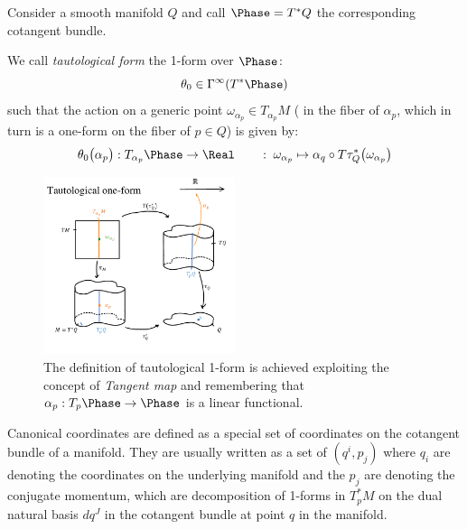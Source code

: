 \documentclass[Main]{subfiles}
\begin{document}
					Consider a smooth manifold $Q$ and call $\Phase=T^*Q$ the corresponding cotangent bundle.
					\begin{definition}
						We call \emph{tautological form} the 1-form over $\Phase$:
						\begin{displaymath}
							\theta_0 \in \Gamma^\infty (T^*\Phase)
						\end{displaymath}
					such that the action on a generic point $ \omega_{\alpha_p} \in T_{\alpha_p}M$ ( in the fiber of $\alpha_p$, which in turn is a one-form on the fiber of $p\in Q$) is given by:
						\begin{displaymath}
						\theta_0 \big(\alpha_p \big): T_{\alpha_p}\Phase \rightarrow \Real \qquad : \; \omega_{\alpha_p} \mapsto \alpha_q \circ T \tau^*_Q \big( \omega_{\alpha_p} \big)
						\end{displaymath}
					\end{definition}
					\begin{figure}[h!]
						\centering
   						\includegraphics[width=0.5\textwidth]{Pictures/Tautological1Form} 
 						\caption{The definition of tautological 1-form is achieved exploiting the concept of \emph{Tangent map} and remembering that $\alpha_p: T_p \Phase \rightarrow \Phase$ is a linear functional.} 
  						\centering
					\end{figure}	
	
					\begin{notationfix}
						Canonical coordinates are defined as a special set of coordinates on the cotangent bundle of a manifold. 
						They are usually written as a set of $(q^i,p_j)$ where ${q_i}$ are denoting the coordinates on the underlying manifold and the ${p_j}$ are denoting the conjugate momentum, which are decomposition of 1-forms in $T_p^*M$ on the dual natural basis $d q^J$ in the cotangent bundle at point $q$ in the manifold.
					\end{notationfix}
	
\end{document}
